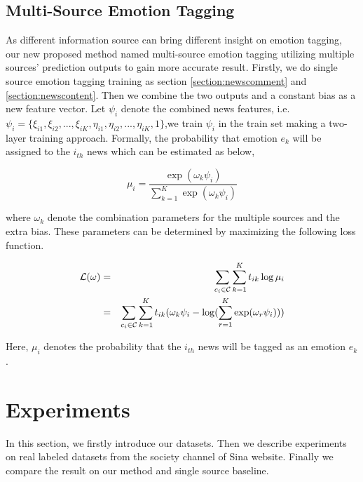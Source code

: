 \documentclass{IEEEtran}
\begin{document}
\vspace{-10pt}
\subsection{Multi-Source Emotion Tagging}
\label{section:key}
As different information source can bring different insight on emotion tagging, our new proposed method named multi-source emotion tagging utilizing multiple sources' prediction outputs to gain more accurate result.
Firstly, we do single source emotion tagging training as section \ref{section:newscomment} and \ref{section:newscontent}. Then we combine the two outputs and a constant bias as a new feature vector. Let $\psi_i$ denote the combined news features, i.e. $\psi_i = \{\xi_{i1},\xi_{i2},...,\xi_{iK},\eta_{i1},\eta_{i2},...,\eta_{iK},1\}$,we train $\psi_i$ in the train set making a two-layer training approach. Formally, the probability that emotion $e_k$ will be assigned to the $i_{th}$ news which can be estimated as below,

\vspace{-7pt}
\begin{equation}
{\mu _i} = \frac{{\exp ({\omega _k}{\psi _i})}}{{\sum\limits_{k = 1}^K {\exp } ({\omega _k}{\psi _i})}}
\end{equation}
\vspace{-7pt}

where $\omega _k$ denote the combination parameters for the multiple sources and the extra bias. These parameters can be determined by maximizing the following loss function.

\vspace{-7pt}
\begin{eqnarray}
{\cal L}(\omega ) &=& \sum\limits_{{c_i} \in {\cal C}} {\sum\limits_{k = 1}^K {{t_{ik}}} } \log {\mu _i}\\
&=& \sum\limits_{{c_i} \in {\cal C}} {\sum\limits_{k = 1}^K {{t_{ik}}} } ({\omega _k}{\psi _i} - \log (\sum\limits_{r = 1}^K {\exp } ({\omega _r}{\psi _i})))\nonumber
\end{eqnarray}
\vspace{-7pt}

Here, $\mu _i$ denotes the probability that the $i_{th}$ news will be tagged as an emotion $e_k$. 

\vspace{-10pt}
\section{Experiments}
\label{section:Experiments}
In this section, we firstly introduce our datasets. Then we describe experiments on real labeled datasets from the society channel of Sina website. Finally we compare the result on our method and single source baseline.
\end{document}
